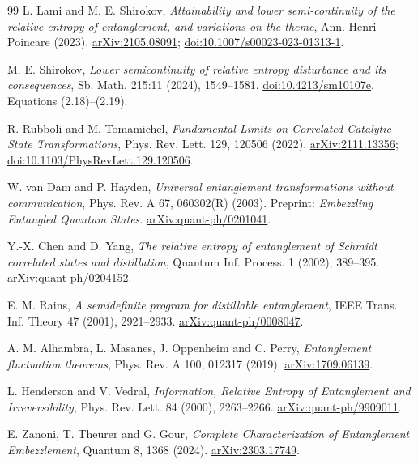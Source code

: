 \documentclass[11pt,a4paper]{article}
\numberwithin{equation}{section}
\theoremstyle{remark}
\begin{document}
\begin{thebibliography}{99}
L. Lami and M. E. Shirokov,
\emph{Attainability and lower semi-continuity of the relative entropy of
entanglement, and variations on the theme},
Ann. Henri Poincare (2023).
\href{https://arxiv.org/abs/2105.08091}{arXiv:2105.08091};
\href{https://doi.org/10.1007/s00023-023-01313-1}{doi:10.1007/s00023-023-01313-1}.

M. E. Shirokov,
\emph{Lower semicontinuity of relative entropy disturbance and its consequences},
Sb. Math. 215:11 (2024), 1549--1581.
\href{https://doi.org/10.4213/sm10107e}{doi:10.4213/sm10107e}.
Equations (2.18)--(2.19).

R. Rubboli and M. Tomamichel,
\emph{Fundamental Limits on Correlated Catalytic State Transformations},
Phys. Rev. Lett. 129, 120506 (2022).
\href{https://arxiv.org/abs/2111.13356}{arXiv:2111.13356};
\href{https://doi.org/10.1103/PhysRevLett.129.120506}{doi:10.1103/PhysRevLett.129.120506}.

W. van Dam and P. Hayden,
\emph{Universal entanglement transformations without communication},
Phys. Rev. A 67, 060302(R) (2003).
Preprint: \emph{Embezzling Entangled Quantum States}.
\href{https://arxiv.org/abs/quant-ph/0201041}{arXiv:quant-ph/0201041}.

Y.-X. Chen and D. Yang,
\emph{The relative entropy of entanglement of Schmidt correlated states
and distillation}, Quantum Inf. Process. 1 (2002), 389--395.
\href{https://arxiv.org/abs/quant-ph/0204152}{arXiv:quant-ph/0204152}.

E. M. Rains,
\emph{A semidefinite program for distillable entanglement},
IEEE Trans. Inf. Theory 47 (2001), 2921--2933.
\href{https://arxiv.org/abs/quant-ph/0008047}{arXiv:quant-ph/0008047}.

A. M. Alhambra, L. Masanes, J. Oppenheim and C. Perry,
\emph{Entanglement fluctuation theorems},
Phys. Rev. A 100, 012317 (2019).
\href{https://arxiv.org/abs/1709.06139}{arXiv:1709.06139}.

L. Henderson and V. Vedral,
\emph{Information, Relative Entropy of Entanglement and Irreversibility},
Phys. Rev. Lett. 84 (2000), 2263--2266.
\href{https://arxiv.org/abs/quant-ph/9909011}{arXiv:quant-ph/9909011}.

E. Zanoni, T. Theurer and G. Gour,
\emph{Complete Characterization of Entanglement Embezzlement},
Quantum 8, 1368 (2024).
\href{https://arxiv.org/abs/2303.17749}{arXiv:2303.17749}.


\end{thebibliography}
\end{document}
